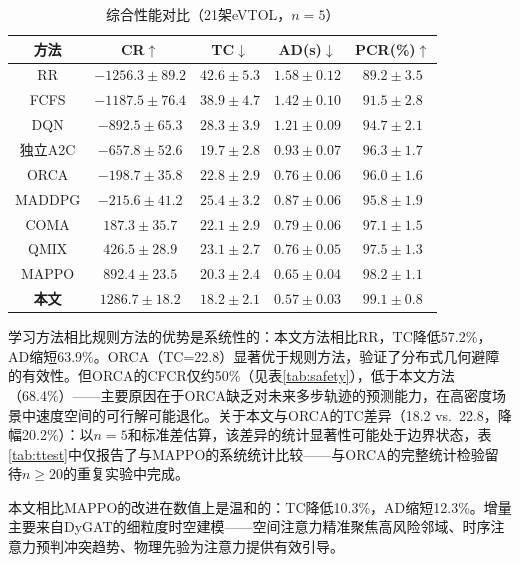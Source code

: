 \documentclass[12pt,a4paper,UTF8]{ctexart}
\begin{document}
\begin{table}[H]
    \centering
    \caption{综合性能对比（21架eVTOL，$n=5$）}
    \label{tab:comparison}
    \begin{tabular}{|c|c|c|c|c|}
        \hline
        \textbf{方法} & \textbf{CR$\uparrow$} & \textbf{TC$\downarrow$} & \textbf{AD(s)$\downarrow$} & \textbf{PCR(\%)$\uparrow$} \\
        \hline
        RR & $-1256.3\pm89.2$ & $42.6\pm5.3$ & $1.58\pm0.12$ & $89.2\pm3.5$ \\
        FCFS & $-1187.5\pm76.4$ & $38.9\pm4.7$ & $1.42\pm0.10$ & $91.5\pm2.8$ \\
        DQN & $-892.5\pm65.3$ & $28.3\pm3.9$ & $1.21\pm0.09$ & $94.7\pm2.1$ \\
        独立A2C & $-657.8\pm52.6$ & $19.7\pm2.8$ & $0.93\pm0.07$ & $96.3\pm1.7$ \\
        ORCA & $-198.7\pm35.8$ & $22.8\pm2.9$ & $0.76\pm0.06$ & $96.0\pm1.6$ \\
        MADDPG & $-215.6\pm41.2$ & $25.4\pm3.2$ & $0.87\pm0.06$ & $95.8\pm1.9$ \\
        COMA & $187.3\pm35.7$ & $22.1\pm2.9$ & $0.79\pm0.06$ & $97.1\pm1.5$ \\
        QMIX & $426.5\pm28.9$ & $23.1\pm2.7$ & $0.76\pm0.05$ & $97.5\pm1.3$ \\
        MAPPO & $892.4\pm23.5$ & $20.3\pm2.4$ & $0.65\pm0.04$ & $98.2\pm1.1$ \\
        \textbf{本文} & $\mathbf{1286.7\pm18.2}$ & $\mathbf{18.2\pm2.1}$ & $\mathbf{0.57\pm0.03}$ & $\mathbf{99.1\pm0.8}$ \\
        \hline
    \end{tabular}
\end{table}

学习方法相比规则方法的优势是系统性的：本文方法相比RR，TC降低57.2\%，AD缩短63.9\%。ORCA（TC=22.8）显著优于规则方法，验证了分布式几何避障的有效性。但ORCA的CFCR仅约50\%（见表\ref{tab:safety}），低于本文方法（68.4\%）——主要原因在于ORCA缺乏对未来多步轨迹的预测能力，在高密度场景中速度空间的可行解可能退化。关于本文与ORCA的TC差异（18.2 vs.\ 22.8，降幅20.2\%）：以$n=5$和标准差估算，该差异的统计显著性可能处于边界状态，表\ref{tab:ttest}中仅报告了与MAPPO的系统统计比较——与ORCA的完整统计检验留待$n\geq20$的重复实验中完成。

本文相比MAPPO的改进在数值上是温和的：TC降低10.3\%，AD缩短12.3\%。增量主要来自DyGAT的细粒度时空建模——空间注意力精准聚焦高风险邻域、时序注意力预判冲突趋势、物理先验为注意力提供有效引导。
\end{document}
